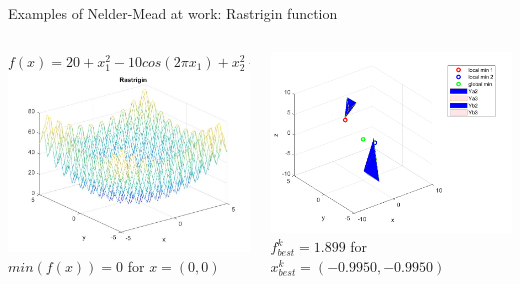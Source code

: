 \documentclass{beamer}
\begin{document}
\begin{frame}{Examples of Nelder-Mead at work: Rastrigin function}
\begin{columns}
\begin{column}{0.49\linewidth}
	\small $f(x) = 20 + x_1^2 - 10cos(2\pi x_1) + x_2^2 - 10cos(2\pi x_2)$ \\
	\includegraphics[width=0.95\linewidth]{rastriginFunction}	\\
	$min(f(x))= 0 $ for $x = (0,0)$
\end{column}
\begin{column}{0.49\linewidth}
	\includegraphics[width=0.95\linewidth]{Rastrigin2} \\
	$f^k_{best}= 1.899 $ for $x^k_{best}= (-0.9950, -0.9950)$
\end{column}
\end{columns}
\end{frame}
\end{document}
